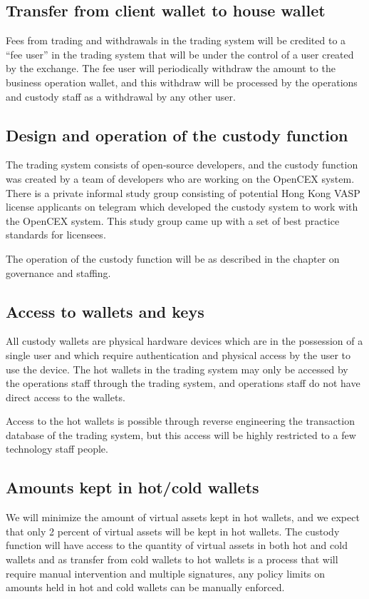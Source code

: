 \subsection{Transfer from client wallet to house wallet}
Fees from trading and withdrawals in the trading system will be
credited to a ``fee user'' in the trading system that will be under
the control of a user created by the exchange.  The fee user will
periodically withdraw the amount to the business operation wallet,
and this withdraw will be processed by the operations and custody
staff as a withdrawal by any other user.

\subsection{Design and operation of the custody function}

The trading system consists of open-source developers, and the custody
function was created by a team of developers who are working on the
OpenCEX system.  There is a private informal study group consisting of
potential Hong Kong VASP license applicants on telegram which
developed the custody system to work with the OpenCEX system. This
study group came up with a set of best practice standards for
licensees.

The operation of the custody function will be as described in the
chapter on governance and staffing.

\subsection{Access to wallets and keys}
All custody wallets are physical hardware devices which are in the
possession of a single user and which require authentication and
physical access by the user to use the device.  The hot wallets
in the trading system may only be accessed by the operations staff
through the trading system, and operations staff do not have direct
access to the wallets.

Access to the hot wallets is possible through reverse engineering the
transaction database of the trading system, but this access will be
highly restricted to a few technology staff people.

\subsection{Amounts kept in hot/cold wallets}
We will minimize the amount of virtual assets kept in hot wallets, and
we expect that only 2 percent of virtual assets will be kept in hot
wallets.  The custody function will have access to the quantity of
virtual assets in both hot and cold wallets and as transfer from cold
wallets to hot wallets is a process that will require manual
intervention and multiple signatures, any policy limits on amounts
held in hot and cold wallets can be manually enforced.

